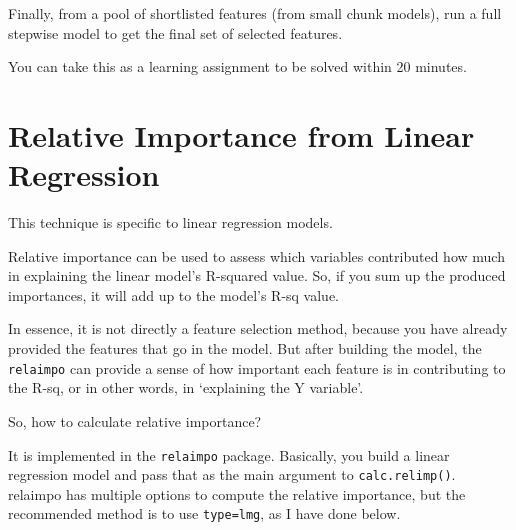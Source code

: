 \documentclass[]{book}
\begin{document}
Finally, from a pool of shortlisted features (from small chunk models), run a full stepwise model to get the final set of selected features.

You can take this as a learning assignment to be solved within 20 minutes.

\hypertarget{relative-importance-from-linear-regression}{%
\section{Relative Importance from Linear Regression}\label{relative-importance-from-linear-regression}}

This technique is specific to linear regression models.

Relative importance can be used to assess which variables contributed how much in explaining the linear model's R-squared value. So, if you sum up the produced importances, it will add up to the model's R-sq value.

In essence, it is not directly a feature selection method, because you have already provided the features that go in the model. But after building the model, the \texttt{relaimpo} can provide a sense of how important each feature is in contributing to the R-sq, or in other words, in `explaining the Y variable'.

So, how to calculate relative importance?

It is implemented in the \texttt{relaimpo} package. Basically, you build a linear regression model and pass that as the main argument to \texttt{calc.relimp()}. relaimpo has multiple options to compute the relative importance, but the recommended method is to use \texttt{type=\textquotesingle{}lmg\textquotesingle{}}, as I have done below.
\end{document}
